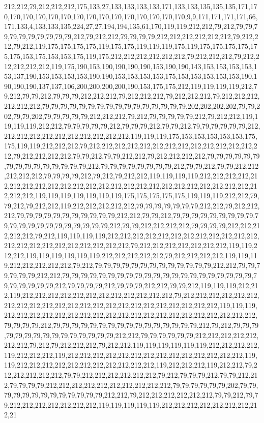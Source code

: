 212,212,79,212,212,212,175,133,27,133,133,133,133,171,133,133,135,135,135,171,170,170,170,170,170,170,170,170,170,170,170,170,170,170,170,9,9,171,171,171,171,66,171,133,4,133,133,135,224,27,27,194,194,135,61,170,119,119,212,212,79,212,79,79,79,79,79,79,79,79,79,79,212,79,212,212,79,79,79,79,212,212,212,212,212,212,79,212,212,79,212,119,175,175,175,175,119,175,175,119,119,119,175,119,175,175,175,175,175,175,153,175,153,153,175,119,175,212,212,212,212,212,212,79,212,212,212,79,212,212,212,212,212,119,175,190,153,190,190,190,190,153,190,190,143,153,153,153,153,153,137,190,153,153,153,153,190,190,153,153,153,153,175,153,153,153,153,153,190,190,190,190,137,137,106,200,200,200,200,190,153,175,175,212,119,119,119,119,212,79,212,79,79,212,79,79,79,212,212,212,79,212,212,212,79,212,212,212,79,212,212,212,212,212,212,79,79,79,79,79,79,79,79,79,79,79,79,79,79,79,79,202,202,202,202,79,79,202,79,79,202,79,79,79,79,79,212,212,212,79,212,79,79,79,79,79,212,79,212,212,119,119,119,119,212,212,79,79,79,79,79,212,79,79,79,212,79,79,212,79,79,79,79,79,79,212,212,212,212,212,212,212,212,212,212,212,119,119,119,175,153,153,153,153,153,175,175,119,119,212,212,212,79,212,212,212,212,212,212,212,212,212,212,212,212,212,212,79,212,212,212,212,79,79,212,79,79,212,212,79,212,212,212,212,79,79,79,79,79,79,79,79,79,79,79,79,79,79,79,212,79,79,79,79,79,79,79,79,212,79,79,212,79,79,212,212,212,212,212,79,79,79,79,212,79,212,79,212,212,119,119,119,119,212,212,212,212,212,212,212,212,212,212,212,212,212,212,212,212,212,212,212,212,212,212,212,212,212,212,212,119,119,119,119,119,119,119,175,175,175,175,175,119,119,119,212,212,79,79,212,79,212,212,119,212,212,212,212,212,79,79,79,79,79,79,79,212,212,79,212,212,212,79,79,79,79,79,79,79,79,79,79,79,212,212,79,79,212,79,79,79,79,79,79,79,79,79,79,79,79,79,79,79,79,79,79,79,79,79,212,79,79,212,212,212,212,79,79,79,79,212,212,212,212,212,79,212,119,119,119,119,212,212,212,212,212,212,212,212,212,212,212,212,212,212,212,212,212,212,212,212,212,212,79,212,212,212,212,212,212,212,119,119,212,212,119,119,119,119,119,119,212,212,212,212,212,79,212,212,212,212,119,119,119,212,212,212,212,212,79,212,79,79,79,79,79,79,79,79,79,79,79,79,79,212,212,79,79,79,79,79,79,212,212,79,79,79,79,79,79,79,79,79,79,79,79,79,79,79,79,79,79,79,79,79,79,79,79,79,79,79,212,79,79,79,79,212,79,79,79,212,212,79,79,212,119,119,119,212,212,119,212,212,212,212,212,212,212,212,212,212,212,212,79,212,212,212,212,212,212,212,212,212,212,212,212,212,212,212,212,212,212,212,212,212,212,212,119,119,119,212,212,212,212,212,212,212,212,212,212,212,212,212,212,212,212,212,212,212,212,79,79,79,79,212,79,79,79,79,79,79,79,79,79,79,79,79,79,79,79,79,212,79,212,79,79,79,79,79,79,79,79,79,79,79,79,79,79,79,212,212,79,79,79,79,79,79,212,212,212,212,212,212,212,79,212,79,212,212,212,79,212,212,119,119,119,119,119,119,212,212,212,212,119,212,212,212,119,212,212,212,212,212,212,212,212,212,212,212,212,212,212,119,119,212,212,212,212,212,212,212,212,212,212,212,119,212,212,212,119,212,212,79,212,212,212,212,212,79,79,212,212,212,212,212,212,79,212,79,79,79,212,79,79,212,212,79,79,79,79,212,212,212,212,212,212,212,212,212,212,79,79,79,79,79,79,202,79,79,79,79,79,79,79,79,79,79,79,79,79,212,212,79,212,212,212,212,212,212,79,79,212,79,79,212,212,212,212,212,212,212,119,119,119,119,119,212,212,212,212,212,212,212,212,21